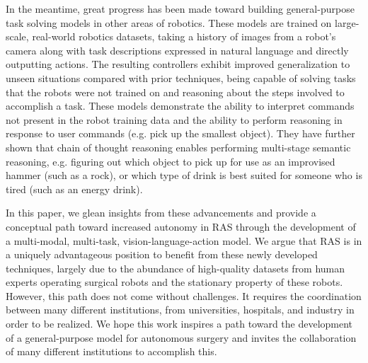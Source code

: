 \documentclass[fleqn,10pt]{wlscirep}\twocolumn
\begin{document}


In the meantime, great progress has been made toward building general-purpose task solving models in other areas of robotics\cite{reed2022generalist, brohan2022rt, brohan2023rt, open_x_embodiment_rt_x_2023, hu2023Toward}. 
These models are trained on large-scale, real-world robotics datasets, taking a history of images from a robot’s camera along with task descriptions expressed in natural language and directly outputting actions. 
The resulting controllers exhibit improved generalization to unseen situations compared with prior techniques, being capable of solving tasks that the robots were not trained on and reasoning about the steps involved to accomplish a task\cite{brohan2023rt}. 
These models demonstrate the ability to interpret commands not present in the robot training data and the ability to perform reasoning in response to user commands (e.g. pick up the smallest object).
They have further shown that chain of thought reasoning enables performing multi-stage semantic reasoning\cite{open_x_embodiment_rt_x_2023}, e.g. figuring out which object to pick up for use as an improvised hammer (such as a rock), or which type of drink is best suited for someone who is tired (such as an energy drink).


In this paper, we glean insights from these advancements and provide a conceptual path toward increased autonomy in RAS through the development of a multi-modal, multi-task, vision-language-action model.
We argue that RAS is in a uniquely advantageous position to benefit from these newly developed techniques, largely due to the abundance of high-quality datasets from human experts operating surgical robots and the stationary property of these robots.
However, this path does not come without challenges. 
It requires the coordination between many different institutions, from universities, hospitals, and industry in order to be realized.
We hope this work inspires a path toward the development of a general-purpose model for autonomous surgery and invites the collaboration of many different institutions to accomplish this.
\end{document}
